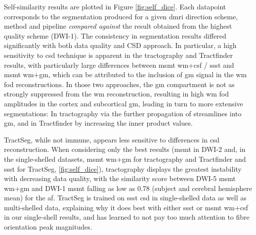 Self-similarity results are plotted in Figure \ref{fig:self_dice}.
Each datapoint corresponds to the segmentation produced for a given \gls{dmri} direction scheme, method and pipeline \textit{compared against} the result obtained from the highest quality scheme (DWI-1).
The consistency in segmentation results differed significantly with both data quality and CSD approach.
In particular, a high sensitivity to \gls{csd} technique is apparent in the tractography and Tractfinder results, with particularly large differences between \gls{msmt} \gls{wm}+\gls{csf} / \gls{ssst} and \gls{msmt} \gls{wm}+\gls{gm}, which can be attributed to the inclusion of \gls{gm} signal in the \gls{wm} \gls{fod} reconstructions.
In those two approaches, the \gls{gm} compartment is not as strongly suppressed from the \gls{wm} reconstruction, resulting in high \gls{wm} \gls{fod} amplitudes in the cortex and subcortical \gls{gm}, leading in turn to more extensive segmentations:
In tractography via the further propagation of streamlines into \gls{gm}, and in Tractfinder by increasing the inner product values.

TractSeg, while not immune, appears less sensitive to differences in \gls{csd} reconstruction.
When considering only the best results (\gls{msmt} in DWI-2 and, in the single-shelled datasets, \gls{msmt} \gls{wm}+\gls{gm} for tractography and Tractfinder and \gls{ssst} for TractSeg, \ref{fig:self_dice}), tractography displays the greatest instability with decreasing data quality, with the similarity score between DWI-5 \gls{msmt} \gls{wm}+\gls{gm} and DWI-1 \gls{msmt} falling as low as 0.78 (subject and cerebral hemisphere mean) for the \gls{af}.
TractSeg is trained on \gls{ssst} \gls{csd} in single-shelled data as well as multi-shelled data, explaining why it does best with either \gls{ssst} or \gls{msmt} \gls{wm}+\gls{csf} in our single-shell results, and has learned to not pay too much attention to fibre orientation peak magnitudes.

